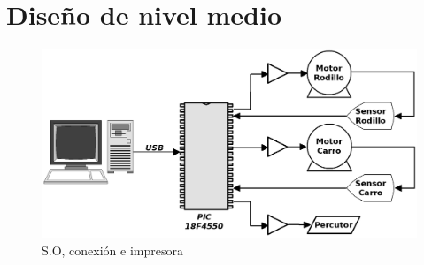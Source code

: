 \section{Dise\~no de nivel medio}
%

\begin{figure}[htp]
\centering
\includegraphics[width=13cm]{./img/pc_uc_motors.png}
\caption{S.O, conexi\'on e impresora}
\label{fig:pc_uc_motors}
\end{figure}